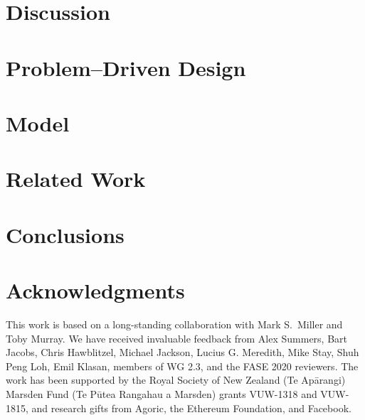 \documentclass[acmsmall]{acmart}
\newcommand{\sophia}[1]{#1} %
\newcommand{\susan}[1]{#1} %
\begin{document}
\section{Discussion}
\label{sect:discussion} 


\section{Problem--Driven Design}
\label{sect:problemdriven} 


\section{Model}
\label{sect:model}


\section{Related Work}
\label{sect:related}


\section{Conclusions}
\label{sect:conclusion}


\section{Acknowledgments}

\sophia{This work is based on a long-standing collaboration with Mark
  S.\ Miller and Toby Murray.
We have received invaluable feedback from Alex Summers, Bart Jacobs,  Chris Hawblitzel,
Michael Jackson, Lucius G. Meredith,
Mike Stay, Shuh Peng Loh,  Emil Klasan, members of WG 2.3, 
and the FASE 2020  reviewers.
The work has been supported by the 
Royal Society of New Zealand (Te Ap\={a}rangi) Marsden Fund (Te P\={u}tea Rangahau a Marsden)
grants VUW-1318 and VUW-1815, and research gifts from Agoric\susan{, the Ethereum Foundation,} and
Facebook.}








\end{document}
